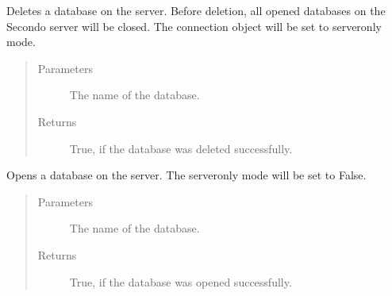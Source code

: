 \documentclass[letterpaper,10pt,english]{sphinxmanual}
\begin{document}
\begin{fulllineitems}
\begin{fulllineitems}
\label{\detokenize{index:secondodb.api.secondoapi.Connection.delete_database}}
Deletes a database on the  server. Before deletion, all opened databases on the Secondo server will be
closed. The connection object will be set to server\sphinxhyphen{}only mode.
\begin{quote}\begin{description}
\item[{Parameters}] \leavevmode
{} \textendash{} The name of the database.

\item[{Returns}] \leavevmode
True, if the database was deleted successfully.

\end{description}\end{quote}

\end{fulllineitems}


\begin{fulllineitems}
\label{\detokenize{index:secondodb.api.secondoapi.Connection.open_database}}
Opens a database on the  server. The server\sphinxhyphen{}only mode will be set to False.
\begin{quote}\begin{description}
\item[{Parameters}] \leavevmode
{} \textendash{} The name of the database.

\item[{Returns}] \leavevmode
True, if the database was opened successfully.

\end{description}\end{quote}

\end{fulllineitems}



\end{fulllineitems}
\end{document}
